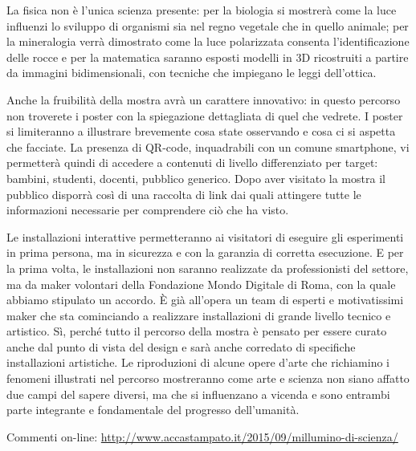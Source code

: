 La fisica non è l'unica scienza presente: per la biologia si mostrerà come la luce influenzi lo sviluppo di organismi sia nel regno vegetale che in quello animale; per la mineralogia verrà dimostrato come la luce polarizzata consenta l'identificazione delle rocce e per la matematica saranno esposti modelli in 3D ricostruiti a partire da immagini bidimensionali, con tecniche che
impiegano le leggi dell'ottica.

Anche la fruibilità della mostra avrà un carattere innovativo: in questo percorso non troverete i poster con la spiegazione dettagliata di quel che vedrete. I poster si limiteranno a illustrare brevemente cosa state osservando e cosa ci si aspetta che facciate. La presenza di QR-code, inquadrabili con un comune smartphone, vi permetterà quindi di accedere a contenuti di livello
differenziato per target: bambini, studenti, docenti, pubblico generico. Dopo aver visitato la mostra il pubblico disporrà così di una raccolta di link dai quali attingere tutte le informazioni necessarie per comprendere ciò che ha visto.

Le installazioni interattive permetteranno ai visitatori di eseguire gli esperimenti in prima persona, ma in sicurezza e con la garanzia di corretta esecuzione. E per la prima volta, le installazioni non saranno realizzate da professionisti del settore, ma da maker volontari della Fondazione Mondo Digitale di Roma, con la quale abbiamo stipulato un accordo. È già all'opera un team di esperti e
motivatissimi maker che sta cominciando a realizzare installazioni di grande livello tecnico e artistico. Sì, perché tutto il percorso della mostra è pensato per essere curato anche dal punto di vista del design e sarà anche corredato di specifiche installazioni artistiche. Le riproduzioni di alcune opere d'arte che richiamino i fenomeni illustrati nel percorso mostreranno come arte e scienza non siano affatto due campi del sapere diversi, ma che si influenzano a vicenda e sono entrambi parte integrante e fondamentale del progresso dell'umanità.


\smallskip
Commenti on-line: \url{http://www.accastampato.it/2015/09/millumino-di-scienza/}
